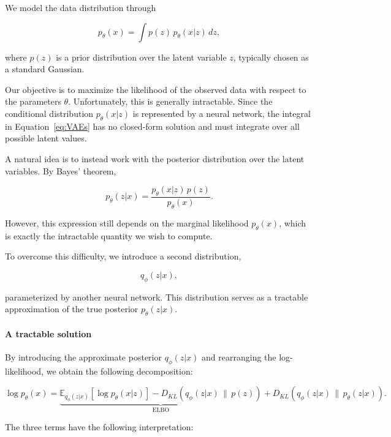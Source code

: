 We model the data distribution through

\begin{equation}
    \label{eq:VAEs}
    p_\theta(x)
    =
    \int p(z)\,p_\theta(x|z)\,dz,
\end{equation}

where $p(z)$ is a prior distribution over the latent variable $z$, typically chosen as a standard Gaussian.

Our objective is to maximize the likelihood of the observed data with respect to the parameters $\theta$. Unfortunately, this is generally intractable. Since the conditional distribution $p_\theta(x|z)$ is represented by a neural network, the integral in Equation~\ref{eq:VAEs} has no closed-form solution and must integrate over all possible latent values.

A natural idea is to instead work with the posterior distribution over the latent variables. By Bayes' theorem,

\begin{equation}
    p_\theta(z|x)
    =
    \frac{p_\theta(x|z)\,p(z)}
         {p_\theta(x)}.
\end{equation}

However, this expression still depends on the marginal likelihood $p_\theta(x)$, which is exactly the intractable quantity we wish to compute.

To overcome this difficulty, we introduce a second distribution,

\[
q_\phi(z|x),
\]

parameterized by another neural network. This distribution serves as a tractable approximation of the true posterior $p_\theta(z|x)$.

\paragraph{A tractable solution}

By introducing the approximate posterior $q_\phi(z|x)$ and rearranging the log-likelihood, we obtain the following decomposition:

\begin{equation}
    \log p_\theta(x) = \underbrace{ \mathbb{E}_{q_\phi(z|x)} \left[ \log p_\theta(x|z) \right] - D_{KL} \left(q_\phi(z|x)\,\|\,p(z)\right)}_{\text{ELBO}}+D_{KL}\left(q_\phi(z|x)\,\|\,p_\theta(z|x)\right).
\end{equation}

The three terms have the following interpretation:

